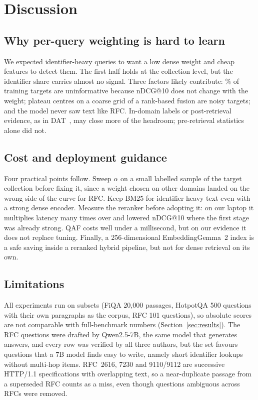 \section{Discussion}
\label{sec:discussion}

\subsection{Why per-query weighting is hard to learn}
We expected identifier-heavy queries to want a low dense weight and cheap
features to detect them. The first half holds at the collection level, but the
identifier share carries almost no signal. Three factors likely contribute:
\QAFinsensitivePct\% of training targets are uninformative because nDCG@10 does
not change with the weight; plateau centres on a coarse grid of a rank-based
fusion are noisy targets; and the model never saw text like RFC. In-domain
labels or post-retrieval evidence, as in DAT~\cite{hsu2025dat}, may close
more of the headroom; pre-retrieval statistics alone did not.

\subsection{Cost and deployment guidance}
Four practical points follow. Sweep $\alpha$ on a small labelled sample of
the target collection before fixing it, since a weight chosen on other domains
landed on the wrong side of the curve for RFC. Keep BM25 for identifier-heavy
text even with a strong dense encoder. Measure the reranker before adopting
it: on our laptop it multiplies latency many times over and lowered nDCG@10
where the first stage was already strong. QAF costs well under a millisecond,
but on our evidence it does not replace tuning. Finally, a 256-dimensional
EmbeddingGemma~2 index is a safe saving inside a reranked hybrid pipeline,
but not for dense retrieval on its own.

\subsection{Limitations}
All experiments run on subsets (FiQA 20{,}000 passages, HotpotQA 500 questions with their own
paragraphs as the corpus, RFC 101 questions), so absolute scores are not
comparable with full-benchmark numbers (Section~\ref{sec:results}). The RFC questions were drafted by Qwen2.5-7B, the same model that
generates answers, and every row was verified by all three authors, but the
set favours questions that a 7B model finds easy to write, namely
short identifier lookups without multi-hop items. RFC~2616, 7230 and
9110/9112 are successive HTTP/1.1 specifications with overlapping text, so a
near-duplicate passage from a superseded RFC counts as a miss, even though
questions ambiguous across RFCs were removed.

